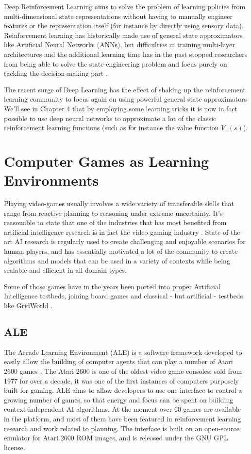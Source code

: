 Deep Reinforcement Learning aims to solve the problem of learning policies from
multi-dimensional state representations without having to manually engineer
features or the representation itself (for instance by directly using sensory
data). Reinforcement learning has historically made use of general state
approximators like Artificial Neural Networks (ANNs), but difficulties in
training multi-layer architectures and the additional learning time has in the
past stopped researchers from being able to solve the state-engineering problem
and focus purely on tackling the decision-making part \citep{melo2008analysis}.

The recent surge of Deep Learning has the effect of shaking up the reinforcement
learning community to focus again on using powerful general state approximators
We'll see in Chapter 4 that by employing some learning tricks it is now in fact
possible to use deep neural networks to approximate a lot of the classic
reinforcement learning functions (such as for instance the value function
$V_{\pi}(s)$).

\section{Computer Games as Learning Environments}

Playing video-games usually involves a wide variety of transferable skills that
range from reactive planning to reasoning under extreme uncertainty. It's
reasonable to state that one of the industries that has most benefited from
artificial intelligence research is in fact the video gaming industry
\citep{laird2001human}. State-of-the-art AI research is regularly used to create
challenging and enjoyable scenarios for human players, and has essentially
motivated a lot of the community to create algorithms and models that can be
used in a variety of contexts while being scalable and efficient in all domain
types.

Some of those games have in the years been ported into proper Artificial
Intelligence testbeds, joining board games and classical - but artificial -
testbeds like GridWorld \citep{russell1995modern}.


\subsection{ALE}

The Arcade Learning Environment (ALE) is a software framework developed to
easily allow the building of computer agents that can play a number of Atari
2600 games \citep{bellemare2012arcade}. The Atari 2600 is one of the oldest
video game consoles: sold from 1977 for over a decade, it was one of the first
instances of computers purposely built for gaming. ALE aims to allow developers
to use one interface to control a growing number of games, so that energy and
focus can be spent on building context-independent AI algorithms. At the moment
over 60 games are available in the platform, and most of them have been featured
in reinforcement learning research and work related to planning. The interface
is built on an open-source emulator for Atari 2600 ROM images, and is released
under the GNU GPL license.

